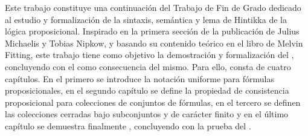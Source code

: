 \begin{isabellebody}
\begin{isamarkuptext}
  Este trabajo constituye una continuación del Trabajo de Fin de Grado
    dedicado al estudio
  y formalización de la sintaxis, semántica y lema de Hintikka de la lógica
  proposicional. Inspirado en la primera sección de la publicación 
    de Julius Michaelis y Tobias Nipkow, y
  basando su contenido teórico en el libro   de Melvin Fitting, este trabajo tiene como objetivo la
  demostración y formalización del , concluyendo
  con el  como consecuencia del mismo. Para ello, consta
  de cuatro capítulos. En el primero se introduce la notación uniforme para 
  fórmulas proposicionales, en el segundo capítulo se define la propiedad de 
  consistencia proposicional para colecciones de conjuntos de fórmulas, en el 
  tercero se definen las colecciones cerradas bajo subconjuntos y de carácter 
  finito y en el último capítulo se demuestra finalmente , concluyendo con la prueba del .


\end{isamarkuptext}
\end{isabellebody}
